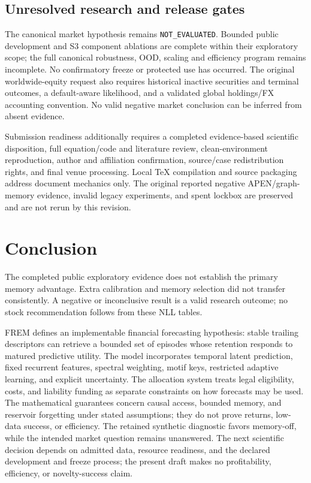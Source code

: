 \documentclass[11pt,a4paper]{article}
\begin{document}
\subsection{Unresolved research and release gates}
The canonical market hypothesis remains \texttt{NOT\_EVALUATED}. Bounded public development and S3 component ablations are complete within their exploratory scope; the full canonical robustness, OOD, scaling and efficiency program remains incomplete. No confirmatory freeze or protected use has occurred. The original worldwide-equity request also requires historical inactive securities and terminal outcomes, a default-aware likelihood, and a validated global holdings/FX accounting convention. No valid negative market conclusion can be inferred from absent evidence.

Submission readiness additionally requires a completed evidence-based scientific disposition, full equation/code and literature review, clean-environment reproduction, author and affiliation confirmation, source/case redistribution rights, and final venue processing. Local TeX compilation and source packaging address document mechanics only. The original reported negative APEN/graph-memory evidence, invalid legacy experiments, and spent lockbox are preserved and are not rerun by this revision.

\section{Conclusion}
The completed public exploratory evidence does not establish the primary memory advantage. Extra calibration and memory selection did not transfer consistently. A negative or inconclusive result is a valid research outcome; no stock recommendation follows from these NLL tables.


FREM defines an implementable financial forecasting hypothesis: stable trailing descriptors can retrieve a bounded set of episodes whose retention responds to matured predictive utility. The model incorporates temporal latent prediction, fixed recurrent features, spectral weighting, motif keys, restricted adaptive learning, and explicit uncertainty. The allocation system treats legal eligibility, costs, and liability funding as separate constraints on how forecasts may be used. The mathematical guarantees concern causal access, bounded memory, and reservoir forgetting under stated assumptions; they do not prove returns, low-data success, or efficiency. The retained synthetic diagnostic favors memory-off, while the intended market question remains unanswered. The next scientific decision depends on admitted data, resource readiness, and the declared development and freeze process; the present draft makes no profitability, efficiency, or novelty-success claim.
\end{document}
